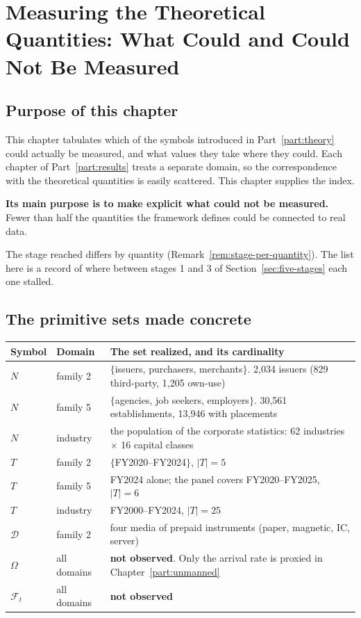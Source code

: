 \chapter{Measuring the Theoretical Quantities: What Could and Could Not Be Measured}
\label{ch:instantiation}

\section{Purpose of this chapter}

This chapter tabulates which of the symbols introduced in Part~\ref{part:theory} could
actually be measured, and what values they take where they could. Each chapter of
Part~\ref{part:results} treats a separate domain, so the correspondence with the theoretical
quantities is easily scattered. This chapter supplies the index.

\textbf{Its main purpose is to make explicit what could not be measured.} Fewer than half the
quantities the framework defines could be connected to real data.

The stage reached differs by quantity (Remark~\ref{rem:stage-per-quantity}). The list here is
a record of where between stages 1 and 3 of Section~\ref{sec:five-stages} each one stalled.

\section{The primitive sets made concrete}

\begin{center}
\begin{tabularx}{\textwidth}{@{}llX@{}}
\toprule
Symbol & Domain & The set realized, and its cardinality \\
\midrule
$N$ & family 2 & $\{$issuers, purchasers, merchants$\}$. 2{,}034 issuers (829 third-party, 1{,}205 own-use) \\
$N$ & family 5 & $\{$agencies, job seekers, employers$\}$. 30{,}561 establishments, 13{,}946 with placements \\
$N$ & industry & the population of the corporate statistics: 62 industries $\times$ 16 capital classes \\
$T$ & family 2 & $\{$FY2020--FY2024$\}$, $|T|=5$ \\
$T$ & family 5 & FY2024 alone; the panel covers FY2020--FY2025, $|T|=6$ \\
$T$ & industry & FY2000--FY2024, $|T|=25$ \\
$\mathcal{D}$ & family 2 & four media of prepaid instruments (paper, magnetic, IC, server) \\
$\Omega$ & all domains & \textbf{not observed}. Only the arrival rate is proxied in Chapter~\ref{part:unmanned} \\
$\mathcal{F}_t$ & all domains & \textbf{not observed} \\
\bottomrule
\end{tabularx}
\label{tab:basic-sets}
\end{center}

